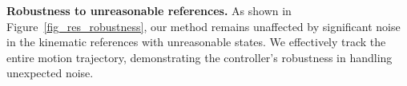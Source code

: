 \noindent\textbf{Robustness to unreasonable references. }
As shown in Figure~\ref{fig_res_robustness}, our method remains unaffected by significant noise in the kinematic references with unreasonable states.
We effectively track the entire motion trajectory, demonstrating the controller's robustness in handling unexpected noise.





